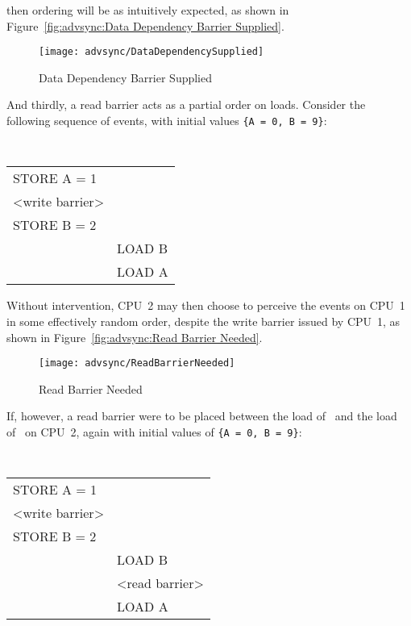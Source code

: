 then ordering will be as intuitively expected, as shown in
Figure~\ref{fig:advsync:Data Dependency Barrier Supplied}.

\begin{figure*}[htbp]
\centering
\texttt{[image: advsync/DataDependencySupplied]}
\caption{Data Dependency Barrier Supplied}
\end{figure*}

And thirdly, a read barrier acts as a partial order on loads.  Consider the
following sequence of events, with initial values
{\tt \{A~=~0, B~=~9\}}:

\vspace{5pt}
\begin{minipage}[t]{\columnwidth}
\tt
\scriptsize
\begin{tabular}{l|p{1.5in}}
	\nf{CPU 1}	& \nf{CPU 2} \\
	\hline
	STORE A = 1	& \\
	<write barrier>	& \\
	STORE B = 2	& \\
			& LOAD B \\
			& LOAD A \\
\end{tabular}
\end{minipage}
\vspace{5pt}

Without intervention, CPU~2 may then choose to perceive the events on CPU~1 in
some effectively random order, despite the write barrier issued by CPU~1, as
shown in Figure~\ref{fig:advsync:Read Barrier Needed}.

\begin{figure*}[htbp]
\centering
\texttt{[image: advsync/ReadBarrierNeeded]}
\caption{Read Barrier Needed}
\end{figure*}

If, however, a read barrier were to be placed between the load of~
and the load of~ on CPU~2, again with initial values of
{\tt \{A~=~0, B~=~9\}}:

\vspace{5pt}
\begin{minipage}[t]{\columnwidth}
\tt
\scriptsize
\begin{tabular}{l|p{1.5in}}
	\nf{CPU 1}	& \nf{CPU 2} \\
	\hline
	STORE A = 1	& \\
	<write barrier>	& \\
	STORE B = 2	& \\
			& LOAD B \\
			& <read barrier> \\
			& LOAD A \\
\end{tabular}
\end{minipage}
\vspace{5pt}

